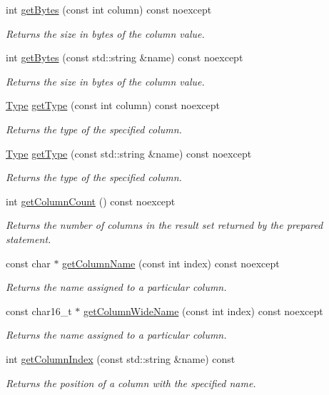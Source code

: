 \begin{DoxyCompactItemize}
int \hyperlink{a00010_aeb571e9157ef46c42ed48fc229b7842d}{get\-Bytes} (const int column) const noexcept
\begin{DoxyCompactList}\small\item\em Returns the size in bytes of the column value. \end{DoxyCompactList}\item 
int \hyperlink{a00010_ad183a562774f9590273bf35c6e232a1a}{get\-Bytes} (const std\-::string \&name) const noexcept
\begin{DoxyCompactList}\small\item\em Returns the size in bytes of the column value. \end{DoxyCompactList}\item 
\hyperlink{a00038_ad7a8ff5f375eca25eb6e3a51d746a04c}{Type} \hyperlink{a00010_a0450ea397b1a9d8dd636b82c8757d33e}{get\-Type} (const int column) const noexcept
\begin{DoxyCompactList}\small\item\em Returns the type of the specified column. \end{DoxyCompactList}\item 
\hyperlink{a00038_ad7a8ff5f375eca25eb6e3a51d746a04c}{Type} \hyperlink{a00010_ae4f049a45c69b9e1bf6db4cf63699f64}{get\-Type} (const std\-::string \&name) const noexcept
\begin{DoxyCompactList}\small\item\em Returns the type of the specified column. \end{DoxyCompactList}\item 
int \hyperlink{a00010_a9e6b9d0d99dea8964a34a3c2f08e99bc}{get\-Column\-Count} () const noexcept
\begin{DoxyCompactList}\small\item\em Returns the number of columns in the result set returned by the prepared statement. \end{DoxyCompactList}\item 
const char $\ast$ \hyperlink{a00010_a5004961d65336631d45de411ffb87cd5}{get\-Column\-Name} (const int index) const noexcept
\begin{DoxyCompactList}\small\item\em Returns the name assigned to a particular column. \end{DoxyCompactList}\item 
const char16\-\_\-t $\ast$ \hyperlink{a00010_af46d30137ad020b1e22ad703810ea002}{get\-Column\-Wide\-Name} (const int index) const noexcept
\begin{DoxyCompactList}\small\item\em Returns the name assigned to a particular column. \end{DoxyCompactList}\item 
int \hyperlink{a00010_ae7eaa050a97cda893e9737bca416f0cb}{get\-Column\-Index} (const std\-::string \&name) const
\begin{DoxyCompactList}\small\item\em Returns the position of a column with the specified name. \end{DoxyCompactList}\end{DoxyCompactItemize}


